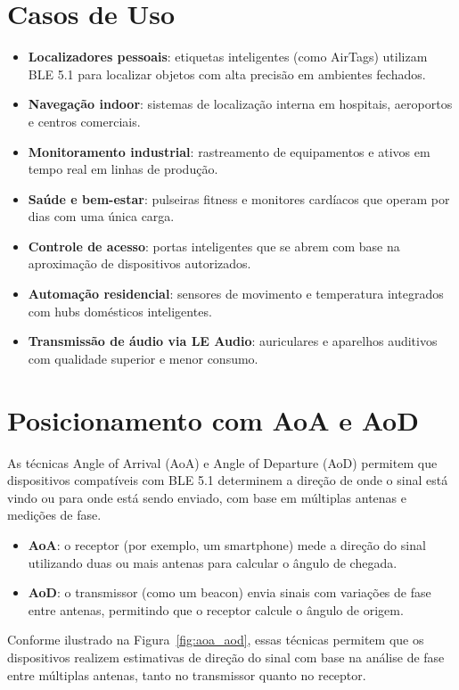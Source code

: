 \documentclass[12pt,a4paper]{report}
\begin{document}
\chapter{Casos de Uso}
\begin{itemize}
    \item \textbf{Localizadores pessoais}: etiquetas inteligentes (como AirTags) utilizam BLE 5.1 para localizar objetos com alta precisão em ambientes fechados.
    \item \textbf{Navegação indoor}: sistemas de localização interna em hospitais, aeroportos e centros comerciais.
    \item \textbf{Monitoramento industrial}: rastreamento de equipamentos e ativos em tempo real em linhas de produção.
    \item \textbf{Saúde e bem-estar}: pulseiras fitness e monitores cardíacos que operam por dias com uma única carga.
    \item \textbf{Controle de acesso}: portas inteligentes que se abrem com base na aproximação de dispositivos autorizados.
    \item \textbf{Automação residencial}: sensores de movimento e temperatura integrados com hubs domésticos inteligentes.
    \item \textbf{Transmissão de áudio via LE Audio}: auriculares e aparelhos auditivos com qualidade superior e menor consumo.
\end{itemize}

\chapter{Posicionamento com AoA e AoD}
As técnicas Angle of Arrival (AoA) e Angle of Departure (AoD) permitem que dispositivos compatíveis com BLE 5.1 determinem a direção de onde o sinal está vindo ou para onde está sendo enviado, com base em múltiplas antenas e medições de fase.

\begin{itemize}
    \item \textbf{AoA}: o receptor (por exemplo, um smartphone) mede a direção do sinal utilizando duas ou mais antenas para calcular o ângulo de chegada.
    \item \textbf{AoD}: o transmissor (como um beacon) envia sinais com variações de fase entre antenas, permitindo que o receptor calcule o ângulo de origem.
\end{itemize}

Conforme ilustrado na Figura~\ref{fig:aoa_aod}, essas técnicas permitem que os dispositivos realizem estimativas de direção do sinal com base na análise de fase entre múltiplas antenas, tanto no transmissor quanto no receptor.
\end{document}
